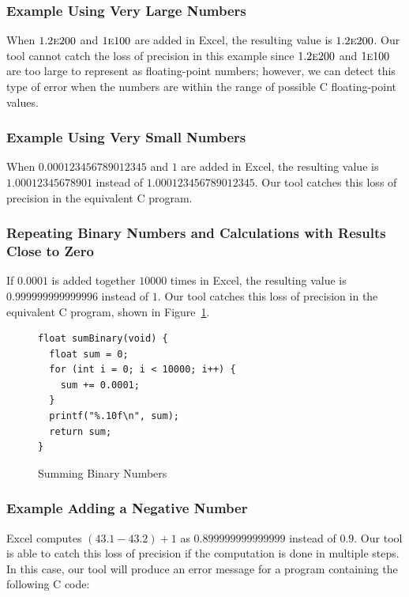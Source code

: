 \subsubsection{Example Using Very Large Numbers}

When $1.2\text{\sc{e}}200$ and $1\text{\sc{e}}100$ are added in Excel, the resulting value is $1.2\text{\sc{e}}200$. Our tool cannot catch the loss of precision in this example since $1.2\text{\sc{e}}200$ and $1\text{\sc{e}}100$ are too large to represent as floating-point numbers; however, we can detect this type of error when the numbers are within the range of possible C floating-point values.

\subsubsection{Example Using Very Small Numbers}

When $0.000123456789012345$ and $1$ are added in Excel, the resulting value is $1.00012345678901$ instead of $1.000123456789012345$. Our tool catches this loss of precision in the equivalent C program.

\subsubsection{Repeating Binary Numbers and Calculations with Results Close to Zero}

If $0.0001$ is added together $10000$ times in Excel, the resulting value is $0.999999999999996$ instead of $1$. Our tool catches this loss of precision in the equivalent C program, shown in Figure~\ref{fig:excel}.

\begin{figure}[t!]
\begin{lstlisting}
float sumBinary(void) {
  float sum = 0;
  for (int i = 0; i < 10000; i++) {
    sum += 0.0001;
  }
  printf("%.10f\n", sum);
  return sum;
}
\end{lstlisting}
\caption{Summing Binary Numbers}
\label{fig:excel}
\end{figure}

\subsubsection{Example Adding a Negative Number}

Excel computes $(43.1 - 43.2) + 1$ as $0.899999999999999$ instead of $0.9$. Our tool is able to catch this loss of precision if the computation is done in multiple steps. In this case, our tool will produce an error message for a program containing the following C code:

